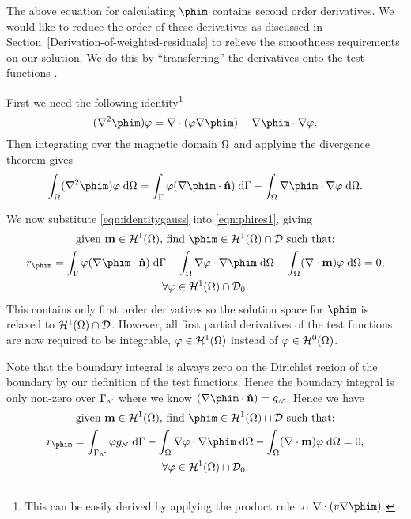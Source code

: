 The above equation for calculating $\phim$ contains second order derivatives.
We would like to reduce the order of these derivatives as discussed in Section~\ref{Derivation-of-weighted-residuals} to relieve the smoothness requirements on our solution.
We do this by ``transferring'' the derivatives onto the test functions \cite{HowardElmanDavidSilvester2006}.

First we need the following identity\footnote{This can be easily derived by applying the product rule to $\nabla \cdot (v \nabla \phim)$.}
\begin{equation}
  (\lap \phim) \tbf =
  \nabla \cdot (\tbf \nabla \phim)
  - \nabla \phim \cdot \nabla \tbf.
  \label{eq:20}
\end{equation}
Then integrating over the magnetic domain $\Omega$ and applying the divergence theorem gives
\begin{equation}
  \intd{(\lap \phim) \tbf} =
  \int_{\boundd} \tbf (\nabla \phim \cdot \nv) \d \boundd
  - \intd{\nabla \phim \cdot \nabla \tbf}.
  \label{eqn:identitygauss}
\end{equation}

We now substitute \eqref{eqn:identitygauss} into \eqref{eqn:phires1}, giving
\begin{gather}
   \text{given $\mv \in \sob^1(\magd)$, find $\phim \in \sob^1(\magd) \cap \Dfs$ such that:} \notag \\
  r_{\phim} = \int_{\boundd} \tbf (\nabla \phim \cdot \nv) \d \boundd
  - \intd{\nabla \tbf \cdot \nabla \phim}
  - \intd{(\nabla \cdot \mv) \tbf} = 0
  , \notag \\
  \forall \tbf \in \sob^1(\magd) \cap \Dfs_0. \notag
\end{gather}
This contains only first order derivatives so the solution space for $\phim$ is relaxed to $\mathcal{H}^1(\Omega) \cap \mathcal{D}$. However, all first partial derivatives of the test functions are now required to be integrable, \ie $\varphi \in \mathcal{H}^1(\Omega)$ instead of $\varphi \in \mathcal{H}^0(\Omega)$.

Note that the boundary integral is always zero on the Dirichlet region of the boundary by our definition of the test functions. Hence the boundary integral is only non-zero over ${\Gamma}_{{\scriptscriptstyle{\mathcal{N}}}}$ where we know $(\nabla \phim \cdot \nv) = g_{\Neu}$. Hence we have
\begin{gather}
   \text{given $\mv \in \sob^1(\magd)$, find $\phim \in \sob^1(\magd) \cap \Dfs$ such that:} \notag \\
  r_{\phim} = \int_{\boundd_\Neu} \tbf g_\Neu \d \boundd
  - \intd{\nabla \tbf \cdot \nabla \phim}
  - \intd{(\nabla \cdot \mv) \tbf} = 0
  , \label{res:contphi} \\
  \forall \tbf \in \sob^1(\magd) \cap \Dfs_0. \notag
\end{gather}

